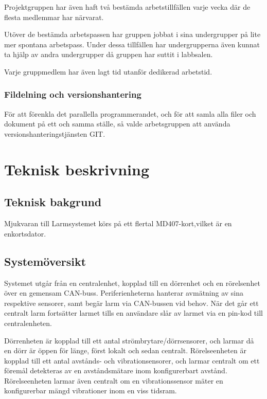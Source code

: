 \documentclass{article}
\begin{document}
Projektgruppen har även haft två bestämda arbetstillfällen varje vecka där de flesta medlemmar har närvarat.

Utöver de bestämda arbetspassen har gruppen jobbat i sina undergrupper på lite mer spontana arbetspass. Under
dessa tillfällen har undergrupperna även kunnat ta hjälp av
andra undergrupper då gruppen har suttit i labbsalen.

Varje gruppmedlem har även lagt tid utanför dedikerad arbetstid.

\subsubsection{Fildelning och versionshantering}
För att förenkla det parallella programmerandet, och för att samla alla filer och dokument på ett och samma ställe, så valde arbetsgruppen att använda versionshanteringstjänsten GIT.


\section{Teknisk beskrivning} %
\subsection{Teknisk bakgrund}
Mjukvaran till Larmsystemet körs på ett flertal MD407-kort,vilket är en enkortsdator.
\subsection{Systemöversikt}

Systemet utgår från en centralenhet, kopplad till en dörrenhet och en rörelsenhet över en gemensam CAN-buss. Periferienheterna hanterar avmätning av sina respektive sensorer, samt begär larm via CAN-bussen vid behov. När det går ett centralt larm fortsätter larmet tills en användare slår av larmet via en pin-kod till centralenheten.

Dörrenheten är kopplad till ett antal strömbrytare/dörrsensorer, och larmar då en dörr är öppen för länge, först lokalt och sedan centralt.
Rörelseenheten är kopplad till ett antal avstånds- och vibrationsensorer, och larmar centralt om ett föremål detekteras av en avståndsmätare inom konfigurerbart avstånd. Rörelseenheten larmar även centralt om en vibrationssensor mäter en konfigurerbar mängd vibrationer inom en viss tidsram. %
\end{document}
